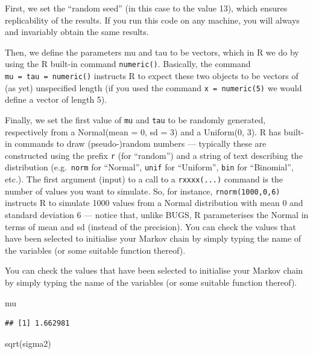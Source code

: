 \documentclass[
]{article}
\newenvironment{Shaded}{\begin{snugshade}}{\end{snugshade}}
\newcommand{\FunctionTok}[1]{\textcolor[rgb]{0.00,0.00,0.00}{#1}}
\newcommand{\NormalTok}[1]{#1}
\begin{document}
First, we set the ``random seed'' (in this case to the value 13), which
ensures replicability of the results. If you run this code on any
machine, you will always and invariably obtain the same results.

Then, we define the parameters mu and tau to be vectors, which in R we
do by using the R built-in command \texttt{numeric()}. Basically, the
command \texttt{mu\ =\ tau\ =\ numeric()} instructs R to expect these
two objects to be vectors of (as yet) unspecified length (if you used
the command \texttt{x\ =\ numeric(5)} we would define a vector of length
5).

Finally, we set the first value of \texttt{mu} and \texttt{tau} to be
randomly generated, respectively from a Normal(mean = 0, sd = 3) and a
Uniform(0, 3). R has built-in commands to draw (pseudo-)random numbers
--- typically these are constructed using the prefix \texttt{r} (for
``random'') and a string of text describing the distribution
(e.g.~\texttt{norm} for ``Normal'', \texttt{unif} for ``Uniform'',
\texttt{bin} for ``Binomial'', etc.). The first argument (input) to a
call to a \texttt{rxxxx(...)} command is the number of values you want
to simulate. So, for instance, \texttt{rnorm(1000,0,6)} instructs R to
simulate 1000 values from a Normal distribution with mean 0 and standard
deviation 6 --- notice that, unlike BUGS, R parameterises the Normal in
terms of mean and sd (instead of the precision). You can check the
values that have been selected to initialise your Markov chain by simply
typing the name of the variables (or some suitable function thereof).

You can check the values that have been selected to initialise your
Markov chain by simply typing the name of the variables (or some
suitable function thereof).

\begin{Shaded}
\begin{Highlighting}[]
\NormalTok{mu}
\end{Highlighting}
\end{Shaded}

\begin{verbatim}
## [1] 1.662981
\end{verbatim}

\begin{Shaded}
\begin{Highlighting}[]
\FunctionTok{sqrt}\NormalTok{(sigma2)}
\end{Highlighting}
\end{Shaded}
\end{document}
